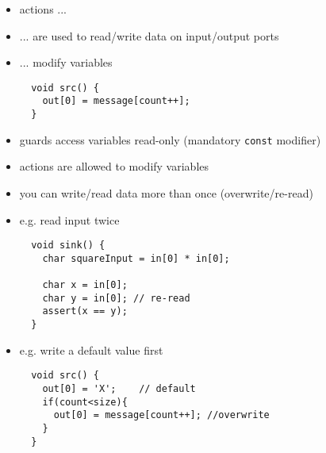 \begin{frame}[fragile=singleslide]
\begin{itemize}
\item actions ...
\item ... are used to read/write data on input/output ports
\item ... modify variables
\begin{lstlisting}
  void src() {
    out[0] = message[count++];
  }
\end{lstlisting}
\item guards access variables read-only (mandatory \lstinline!const! modifier)
\item actions are allowed to modify variables
\end{itemize}
\end{frame}






\begin{frame}[fragile=singleslide]
\begin{itemize}
\item you can write/read data more than once (overwrite/re-read)
\item e.g. read input twice
\begin{lstlisting}
  void sink() {
    char squareInput = in[0] * in[0];

    char x = in[0];
    char y = in[0]; // re-read
    assert(x == y);
  }
\end{lstlisting}
\item e.g. write a default value first
\begin{lstlisting}
  void src() {
    out[0] = 'X';    // default
    if(count<size){
      out[0] = message[count++]; //overwrite
    }
  }
\end{lstlisting}
\end{itemize}
\end{frame}










